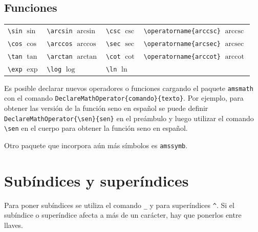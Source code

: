 \documentclass[
  letterpaper,
  DIV=11,
  numbers=noendperiod]{scrreport}
\begin{document}
\hypertarget{funciones}{%
\subsection{Funciones}\label{funciones}}

\begin{longtable}[]{@{}
  >{\raggedright\arraybackslash}p{}
  >{\raggedright\arraybackslash}p{}
  >{\raggedright\arraybackslash}p{}
  >{\raggedright\arraybackslash}p{}@{}}
\toprule()
\endhead
\texttt{\textbackslash{}sin} \(\sin\) & \texttt{\textbackslash{}arcsin}
\(\arcsin\) & \texttt{\textbackslash{}csc} \(\csc\) &
\texttt{\textbackslash{}operatorname\{arccsc\}}
\(\operatorname{arccsc}\) \\
\texttt{\textbackslash{}cos} \(\cos\) & \texttt{\textbackslash{}arccos}
\(\arccos\) & \texttt{\textbackslash{}sec} \(\sec\) &
\texttt{\textbackslash{}operatorname\{arcsec\}}
\(\operatorname{arcsec}\) \\
\texttt{\textbackslash{}tan} \(\tan\) & \texttt{\textbackslash{}arctan}
\(\arctan\) & \texttt{\textbackslash{}cot} \(\cot\) &
\texttt{\textbackslash{}operatorname\{arccot\}}
\(\operatorname{arccot}\) \\
\texttt{\textbackslash{}exp} \(\exp\) & \texttt{\textbackslash{}log}
\(\log\) & \texttt{\textbackslash{}ln} \(\ln\) & \\
\bottomrule()
\end{longtable}

Es posible declarar nuevos operadores o funciones cargando el paquete
\texttt{amsmath} con el comando
\texttt{DeclareMathOperator\{comando\}\{texto\}}. Por ejemplo, para
obtener las versión de la función seno en español se puede definir
\texttt{DeclareMathOperator\{\textbackslash{}sen\}\{sen\}} en el
preámbulo y luego utilizar el comando \texttt{\textbackslash{}sen} en el
cuerpo para obtener la función seno en español.

Otro paquete que incorpora aún más símbolos es \texttt{amssymb}.

\hypertarget{subuxedndices-y-superuxedndices}{%
\section{Subíndices y
superíndices}\label{subuxedndices-y-superuxedndices}}

Para poner subíndices se utiliza el comando \texttt{\_} y para
superíndices \texttt{\^{}}. Si el subíndice o superíndice afecta a más
de un carácter, hay que ponerlos entre llaves.
\end{document}
